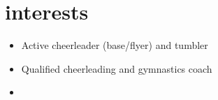 \section{interests}
\begin{entrylist}
\parbox[t]{\textwidth}{
\begin{minipage}[t]{\textwidth}
\begin{itemize}[topsep=0pt]
\item Active cheerleader (base/flyer) and tumbler
\item Qualified cheerleading and gymnastics coach
\item 
\end{itemize}
\end{minipage}
\vspace{\parsep}
}
\\
\end{entrylist}
